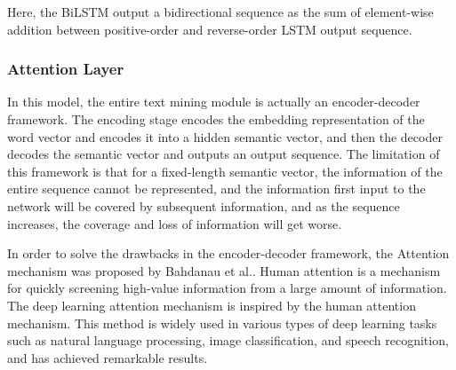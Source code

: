Here, the BiLSTM output a bidirectional sequence as the sum of element-wise addition between positive-order and reverse-order LSTM output sequence.

\subsubsection{Attention Layer}




In this model, the entire text mining module is actually an encoder-decoder framework. The encoding stage encodes the embedding representation of the word vector and encodes it into a hidden semantic vector, and then the decoder decodes the semantic vector and outputs an output sequence. The limitation of this framework is that for a fixed-length semantic vector, the information of the entire sequence cannot be represented, and the information first input to the network will be covered by subsequent information, and as the sequence increases, the coverage and loss of information will get worse.

In order to solve the drawbacks in the encoder-decoder framework, the Attention mechanism was proposed by Bahdanau et al.\cite{bahdanau2014neural}. Human attention is a mechanism for quickly screening high-value information from a large amount of information. The deep learning attention mechanism is inspired by the human attention mechanism. This method is widely used in various types of deep learning tasks such as natural language processing\cite{hu2019introductory}, image classification\cite{fu2017look,sun2018multi}, and speech recognition\cite{chorowski2015attention}, and has achieved remarkable results. 

